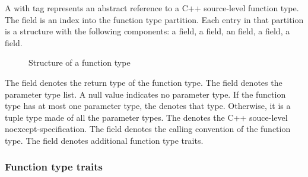 A  with tag  represents
an abstract reference to a C++ source-level function type.
The  field is an index into the function type partition.
Each entry in that partition is a structure with the following components:
a  field, a  field, an  field,
a  field, a  field.
%
\begin{figure}[H]
	\centering
	\caption{Structure of a function type}
	\label{fig:ifc-function-type-structure}
\end{figure}
%
The  field denotes the return type of the function type.
The  field denotes the parameter type list.  A null  value indicates no parameter type. If the function type has at most
one parameter type, the  denotes that type. Otherwise, it is a tuple type made
of all the parameter types.
The  denotes the C++ souce-level noexcept-specification.
The  field denotes the calling convention of the function type.
The  field denotes additional function type traits.


\subsubsection{Function type traits}
\label{sec:ifc-function-type-traits}

